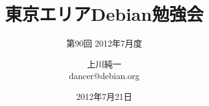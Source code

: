 




\documentclass[cjk,dvipdfmx,12pt]{beamer}
\usepackage{monthlypresentation}



\title{東京エリアDebian勉強会}
\subtitle{第90回 2012年7月度}
\author{上川純一\\dancer@debian.org}
\date{2012年7月21日}



